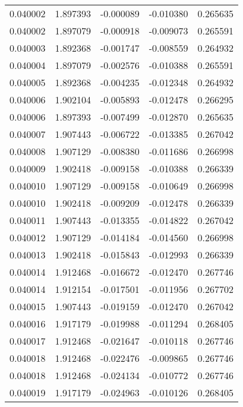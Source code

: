 \begin{tabular}{lrrrr}
0.040002    &  1.897393 & -0.000089 & -0.010380 &             0.265635 \\
0.040002    &  1.897079 & -0.000918 & -0.009073 &             0.265591 \\
0.040003    &  1.892368 & -0.001747 & -0.008559 &             0.264932 \\
0.040004    &  1.897079 & -0.002576 & -0.010388 &             0.265591 \\
0.040005    &  1.892368 & -0.004235 & -0.012348 &             0.264932 \\
0.040006    &  1.902104 & -0.005893 & -0.012478 &             0.266295 \\
0.040006    &  1.897393 & -0.007499 & -0.012870 &             0.265635 \\
0.040007    &  1.907443 & -0.006722 & -0.013385 &             0.267042 \\
0.040008    &  1.907129 & -0.008380 & -0.011686 &             0.266998 \\
0.040009    &  1.902418 & -0.009158 & -0.010388 &             0.266339 \\
0.040010    &  1.907129 & -0.009158 & -0.010649 &             0.266998 \\
0.040010    &  1.902418 & -0.009209 & -0.012478 &             0.266339 \\
0.040011    &  1.907443 & -0.013355 & -0.014822 &             0.267042 \\
0.040012    &  1.907129 & -0.014184 & -0.014560 &             0.266998 \\
0.040013    &  1.902418 & -0.015843 & -0.012993 &             0.266339 \\
0.040014    &  1.912468 & -0.016672 & -0.012470 &             0.267746 \\
0.040014    &  1.912154 & -0.017501 & -0.011956 &             0.267702 \\
0.040015    &  1.907443 & -0.019159 & -0.012470 &             0.267042 \\
0.040016    &  1.917179 & -0.019988 & -0.011294 &             0.268405 \\
0.040017    &  1.912468 & -0.021647 & -0.010118 &             0.267746 \\
0.040018    &  1.912468 & -0.022476 & -0.009865 &             0.267746 \\
0.040018    &  1.912468 & -0.024134 & -0.010772 &             0.267746 \\
0.040019    &  1.917179 & -0.024963 & -0.010126 &             0.268405 \\

\end{tabular}
